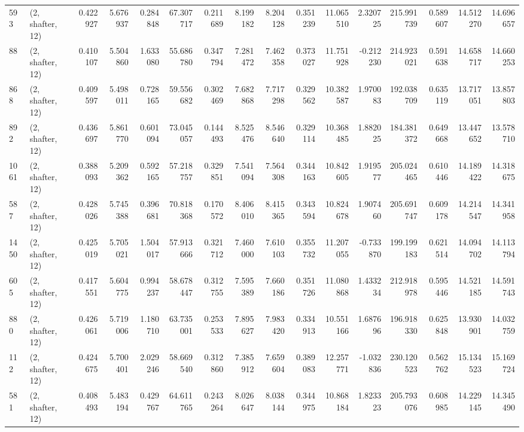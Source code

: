 \begin{tabular}{llrrrrrrrrrrrrrr}
593  &  (2, shafter, 12) &   0.422927 &   5.676937 &   0.284848 &     67.307717 &    0.211689 &    8.199182 &    8.204128 &  0.351239 &  11.065510 &   2.320725 &   215.991739 &   0.589607 &  14.512270 &  14.696657 \\
88   &  (2, shafter, 12) &   0.410107 &   5.504860 &   1.633080 &     55.686780 &    0.347794 &    7.281472 &    7.462358 &  0.373027 &  11.751928 &  -0.212230 &   214.923021 &   0.591638 &  14.658717 &  14.660253 \\
868  &  (2, shafter, 12) &   0.409597 &   5.498011 &   0.728165 &     59.556682 &    0.302469 &    7.682868 &    7.717298 &  0.329562 &  10.382587 &   1.970083 &   192.038709 &   0.635119 &  13.717051 &  13.857803 \\
892  &  (2, shafter, 12) &   0.436697 &   5.861770 &   0.601094 &     73.045057 &    0.144493 &    8.525476 &    8.546640 &  0.329114 &  10.368485 &   1.882025 &   184.381372 &   0.649668 &  13.447652 &  13.578710 \\
1061 &  (2, shafter, 12) &   0.388093 &   5.209362 &   0.592165 &     57.218757 &    0.329851 &    7.541094 &    7.564308 &  0.344163 &  10.842605 &   1.919577 &   205.024465 &   0.610446 &  14.189422 &  14.318675 \\
587  &  (2, shafter, 12) &   0.428026 &   5.745388 &   0.396681 &     70.818368 &    0.170572 &    8.406010 &    8.415365 &  0.343594 &  10.824678 &   1.907460 &   205.691747 &   0.609178 &  14.214547 &  14.341958 \\
1450 &  (2, shafter, 12) &   0.425019 &   5.705021 &   1.504017 &     57.913666 &    0.321712 &    7.460000 &    7.610103 &  0.355732 &  11.207055 &  -0.733870 &   199.199183 &   0.621514 &  14.094702 &  14.113794 \\
605  &  (2, shafter, 12) &   0.417551 &   5.604775 &   0.994237 &     58.678447 &    0.312755 &    7.595389 &    7.660186 &  0.351726 &  11.080868 &   1.433234 &   212.918978 &   0.595446 &  14.521185 &  14.591743 \\
880  &  (2, shafter, 12) &   0.426061 &   5.719006 &   1.180710 &     63.735001 &    0.253533 &    7.895627 &    7.983420 &  0.334913 &  10.551166 &   1.687696 &   196.918330 &   0.625848 &  13.930901 &  14.032759 \\
112  &  (2, shafter, 12) &   0.424675 &   5.700401 &   2.029246 &     58.669540 &    0.312860 &    7.385912 &    7.659604 &  0.389083 &  12.257771 &  -1.032836 &   230.120523 &   0.562762 &  15.134523 &  15.169724 \\
581  &  (2, shafter, 12) &   0.408493 &   5.483194 &   0.429767 &     64.611765 &    0.243264 &    8.026647 &    8.038144 &  0.344975 &  10.868184 &   1.823323 &   205.793076 &   0.608985 &  14.229145 &  14.345490 \\

\end{tabular}

